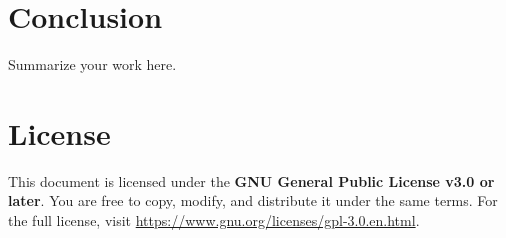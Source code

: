 \documentclass[11pt, a4paper, oneside]{article}
\begin{document}
\section{Conclusion}

Summarize your work here.

\section*{License}

This document is licensed under the \textbf{GNU General Public License v3.0 or later}. You are free to copy, modify, and distribute it under the same terms. For the full license, visit \url{https://www.gnu.org/licenses/gpl-3.0.en.html}.

\end{document}

